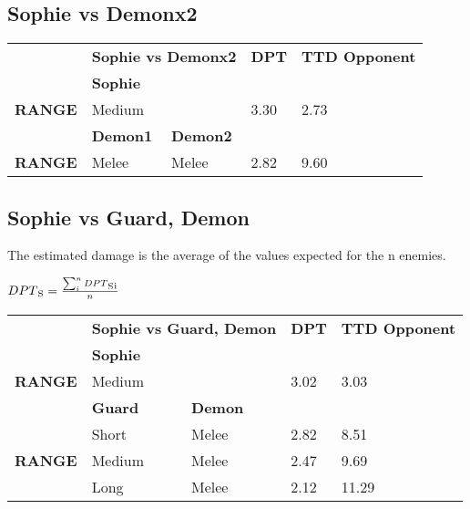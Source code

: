 \subsection{Sophie vs Demonx2}
\begin{table}[H]
  \centering
\begin{tabular}{ll|l|l|l|}
\cline{2-5}
\multicolumn{1}{l|}{} & \multicolumn{2}{c|}{\cellcolor[HTML]{C0C0C0}\textbf{Sophie vs Demonx2}} & \cellcolor[HTML]{C0C0C0}\textbf{DPT} & \cellcolor[HTML]{C0C0C0}\textbf{TTD Opponent} \\ \cline{2-5} 
\multicolumn{1}{l|}{\textbf{}} & \multicolumn{2}{l|}{\textbf{Sophie}} & \multicolumn{2}{l|}{} \\ \hline
\multicolumn{1}{|l|}{\cellcolor[HTML]{C0C0C0}\textbf{RANGE}} & \multicolumn{2}{l|}{Medium} & 3.30 & 2.73 \\ \hline
\multicolumn{1}{l|}{} & \textbf{Demon1} & \textbf{Demon2} & \multicolumn{2}{l|}{} \\ \hline
\multicolumn{1}{|l|}{\cellcolor[HTML]{C0C0C0}\textbf{RANGE}} & Melee & Melee & 2.82 & 9.60 \\ \hline
\end{tabular}
\end{table}

\subsection{Sophie vs Guard, Demon}
The estimated damage is the average of the values expected for the n enemies.
\begin{center}
 $DPT\textsubscript{S}=\frac{\sum_{i}^{n} DPT\textsubscript{S}\textsubscript{i}}{n}$
\end{center}

\begin{table}[H]
  \centering
\begin{tabular}{ll|l|l|l|}
\cline{2-5}
\multicolumn{1}{l|}{} & \multicolumn{2}{c|}{\cellcolor[HTML]{C0C0C0}\textbf{Sophie vs Guard, Demon}} & \cellcolor[HTML]{C0C0C0}\textbf{DPT} & \cellcolor[HTML]{C0C0C0}\textbf{TTD Opponent} \\ \cline{2-5} 
\multicolumn{1}{l|}{\textbf{}} & \multicolumn{2}{l|}{\textbf{Sophie}} & \multicolumn{2}{l|}{} \\ \hline
\multicolumn{1}{|l|}{\cellcolor[HTML]{C0C0C0}\textbf{RANGE}} & \multicolumn{2}{l|}{Medium} & 3.02 & 3.03 \\ \hline
\multicolumn{1}{l|}{} & \textbf{Guard} & \textbf{Demon} & \multicolumn{2}{l|}{} \\ \hline
\multicolumn{1}{|l|}{\cellcolor[HTML]{C0C0C0}} & Short & Melee & 2.82 & 8.51 \\ \cline{2-5} 
\multicolumn{1}{|l|}{\cellcolor[HTML]{C0C0C0}\textbf{RANGE}} & Medium & Melee & 2.47 & 9.69 \\ \cline{2-5} 
\multicolumn{1}{|l|}{\cellcolor[HTML]{C0C0C0}} & Long & Melee & 2.12 & 11.29 \\ \hline
\end{tabular}
\end{table}

